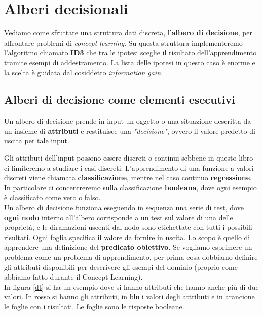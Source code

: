 \chapter{Alberi decisionali}
Vediamo come sfruttare una struttura dati discreta, l'\textbf{albero di
  decisione}, per affrontare problemi di \textit{concept learning}. Su questa
struttura implementeremo l'algoritmo chiamato \textbf{ID3} che tra le ipotesi
sceglie il risultato dell'apprendimento tramite esempi di addestramento. La
lista delle ipotesi in questo caso è enorme e la scelta è guidata dal cosiddetto
\textit{information gain}.
\section{Alberi di decisione come elementi esecutivi}
\begin{definizione}
Un albero di decisione prende in input un oggetto o una situazione descritta da un insieme di \textbf{attributi} e restituisce una \textit{"decisione"}, ovvero il valore predetto di uscita per tale input.
\end{definizione}
Gli attributi dell'input possono essere discreti o continui sebbene in questo libro ci limiteremo a studiare i casi discreti. L'apprendimento di una funzione a valori discreti viene chiamata \textbf{classificazione}, mentre nel caso continuo \textbf{regressione}. In particolare ci concentreremo sulla classificazione \textbf{booleana}, dove ogni esempio è classificato come vero o falso.\\  Un albero di decisione funziona eseguendo in sequenza una serie di test, dove \textbf{ogni nodo} interno all'albero corrisponde a un test sul valore di una delle proprietà, e le diramazioni uscenti dal nodo sono etichettate con tutti i possibili risultati. Ogni foglia specifica il valore da fornire in uscita. Lo scopo è quello di apprendere una definizione del \textbf{predicato obiettivo}. Se vogliamo esprimere un problema come un problema di apprendimento, per prima cosa dobbiamo definire gli attributi disponibili per descrivere gli esempi del dominio (proprio come abbiamo fatto durante il Concept Learning).\\
In figura \ref{dt} si ha un esempio dove si hanno attributi che hanno anche più di due valori. In rosso si hanno gli
attributi, in blu i valori degli attributi e in arancione le foglie con i
risultati. Le foglie sono le risposte booleane.
